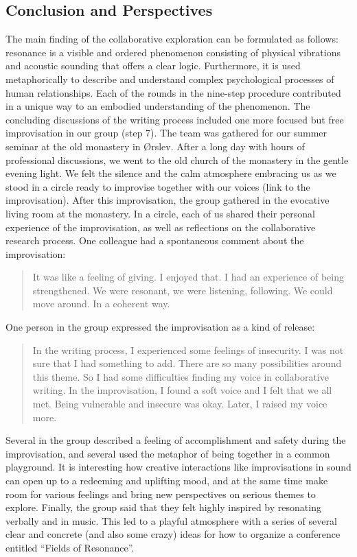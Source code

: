 \begin{adjmulticols}{2}{0mm}{0mm}
\chapter{Conclusion and Perspectives}
The main finding of the collaborative exploration can be formulated as follows: resonance is a visible and ordered phenomenon consisting of physical vibrations and acoustic sounding that offers a clear logic. Furthermore, it is used metaphorically to describe and understand complex psychological processes of human relationships. Each of the rounds in the nine-step procedure contributed in a unique way to an embodied understanding of the phenomenon. The concluding discussions of the writing process included one more focused but free improvisation in our group (step 7). The team was gathered for our summer seminar at the old monastery in Ørslev. After a long day with hours of professional discussions, we went to the old church of the monastery in the gentle evening light. We felt the silence and the calm atmosphere embracing us as we stood in a circle ready to improvise together with our voices (link to the improvisation). After this improvisation, the group gathered in the evocative living room at the monastery. In a circle, each of us shared their personal experience of the improvisation, as well as reflections on the collaborative research process. One colleague had a spontaneous comment about the improvisation: 
    \blockquote{It was like a feeling of giving. I enjoyed that. I had an experience of being strengthened. We were resonant, we were listening, following. We could move around. In a coherent way.}
One person in the group expressed the improvisation as a kind of release:
    \blockquote{In the writing process, I experienced some feelings of insecurity. I was not sure that I had something to add. There are so many possibilities around this theme. So I had some difficulties finding my voice in collaborative writing. In the improvisation, I found a soft voice and I felt that we all met. Being vulnerable and insecure was okay. Later, I raised my voice more.}
Several in the group described a feeling of accomplishment and safety during the improvisation, and several used the metaphor of being together in a common playground. It is interesting how creative interactions like improvisations in sound can open up to a redeeming and uplifting mood, and at the same time make room for various feelings and bring new perspectives on serious themes to explore. Finally, the group said that they felt highly inspired by resonating verbally and in music. This led to a playful atmosphere with a series of several clear and concrete (and also some crazy) ideas for how to organize a conference entitled \enquote{Fields of Resonance}.
    \end{adjmulticols}